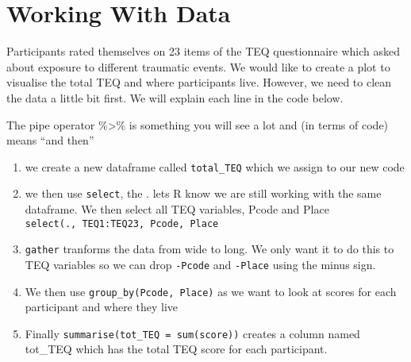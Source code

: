 \documentclass[]{book}
\newenvironment{Shaded}{\begin{snugshade}}{\end{snugshade}}
\newcommand{\DataTypeTok}[1]{\textcolor[rgb]{0.13,0.29,0.53}{#1}}
\newcommand{\KeywordTok}[1]{\textcolor[rgb]{0.13,0.29,0.53}{\textbf{#1}}}
\newcommand{\NormalTok}[1]{#1}
\newcommand{\OperatorTok}[1]{\textcolor[rgb]{0.81,0.36,0.00}{\textbf{#1}}}
\newcommand{\StringTok}[1]{\textcolor[rgb]{0.31,0.60,0.02}{#1}}
\providecommand{\tightlist}{%
  \setlength{\itemsep}{0pt}\setlength{\parskip}{0pt}}
\begin{document}
\hypertarget{working-with-data}{%
\section{Working With Data}\label{working-with-data}}

Participants rated themselves on 23 items of the TEQ questionnaire which asked about exposure to different traumatic events. We would like to create a plot to visualise the total TEQ and where participants live. However, we need to clean the data a little bit first. We will explain each line in the code below.

The pipe operator \%\textgreater{}\% is something you will see a lot and (in terms of code) means ``and then''

\begin{enumerate}
\def\labelenumi{\arabic{enumi}.}
\tightlist
\item
  we create a new dataframe called \texttt{total\_TEQ} which we assign to our new code
\item
  we then use \texttt{select}, the . lets R know we are still working with the same dataframe. We then select all TEQ variables, Pcode and Place \texttt{select(.,\ TEQ1:TEQ23,\ Pcode,\ Place}
\item
  \texttt{gather} tranforms the data from wide to long. We only want it to do this to TEQ variables so we can drop \texttt{-Pcode} and \texttt{-Place} using the minus sign.
\item
  We then use \texttt{group\_by(Pcode,\ Place)} as we want to look at scores for each participant and where they live
\item
  Finally \texttt{summarise(tot\_TEQ\ =\ sum(score))} creates a column named tot\_TEQ which has the total TEQ score for each participant.
\end{enumerate}

\begin{Shaded}
\end{Shaded}
\end{document}

